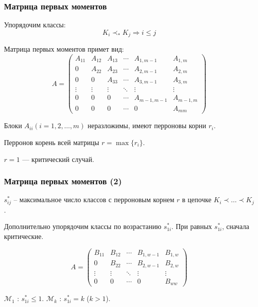 \documentclass{beamer}
\renewcommand{\leq}{\leqslant}
\begin{document}
	\begin{frame}
		\frametitle{Матрица первых моментов}

		Упорядочим классы:				
		\begin{equation*}
			K_i \prec_* K_j \Rightarrow i \leq j
		\end{equation*}
		
		Матрица первых моментов примет вид:
		\begin{equation*}
			A =
			\begin{pmatrix}
				A_{11} & A_{12} & A_{13} & \cdots & A_{1,m-1} & A_{1,m} \\
				0      & A_{22} & A_{23} & \cdots & A_{2,m-1} & A_{2,m} \\
				0      & 0      & A_{33} & \cdots & A_{3,m-1} & A_{3,m} \\
				\vdots & \vdots & \vdots & \ddots & \vdots & \vdots \\
				0      & 0      & 0      & \cdots & A_{m-1,m-1} & A_{m-1,m} \\
				0      & 0      & 0      & \cdots & 0      & A_{mm}
			\end{pmatrix}
		\end{equation*}
		
		Блоки $A_{ii} (i = 1,2,\ldots,m)$ неразложимы, имеют перроновы корни $r_i$.
		
		Перронов корень всей матрицы $r = \max\{r_i\}$.
		
		$r = 1$ --- критический случай.
	\end{frame}
	
	\begin{frame}
		\frametitle{Матрица первых моментов (2)}
		
		$s_{ij}^*$ -- максимальное число классов с перроновым корнем $r$ в цепочке $K_i \prec \ldots \prec K_j$.
		
		Дополнительно упорядочим классы по возрастанию $s_{1i}^*$. При равных $s_{1i}^*$, сначала критические.
		
		\begin{equation*}
		A =
		\begin{pmatrix}
		B_{11} & B_{12} & \cdots & B_{1,w-1} & B_{1,w} \\
		0      & B_{22} & \cdots & B_{2,w-1} & B_{2,w} \\
		\vdots & \vdots & \ddots & \vdots & \vdots \\
		0      & 0      & \cdots & 0      & B_{ww}
		\end{pmatrix}
		\end{equation*}

		$\mathcal{M}_1$ : $s_{1i}^* \leq 1$. $\mathcal{M}_k$ : $s_{1i}^* = k$ ($k > 1$).
	\end{frame}
	
\end{document}
